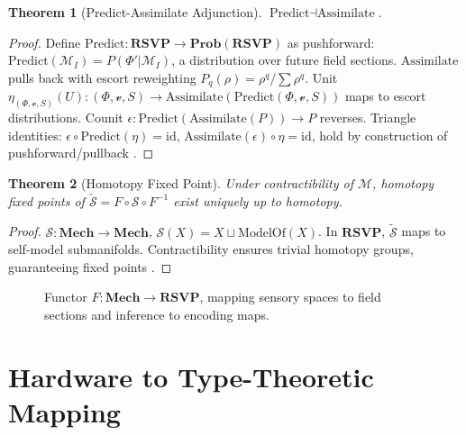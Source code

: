 \documentclass{article}
\newtheorem{theorem}{Theorem}
\begin{document}
\begin{theorem}[Predict-Assimilate Adjunction]
$\text{Predict} \dashv \text{Assimilate}$.
\end{theorem}
\begin{proof}
Define $\text{Predict}: \mathbf{RSVP} \to \mathbf{Prob}(\mathbf{RSVP})$ as pushforward: $\text{Predict}(\mathcal{M}_I) = P(\Phi' | \mathcal{M}_I)$, a distribution over future field sections. $\text{Assimilate}$ pulls back with escort reweighting $P_q(\rho) = \rho^q / \sum \rho^q$. Unit $\eta_{(\Phi,\mathcal{v},S)}(U): (\Phi, \mathcal{v}, S) \to \text{Assimilate}(\text{Predict}(\Phi, \mathcal{v}, S))$ maps to escort distributions. Counit $\epsilon: \text{Predict}(\text{Assimilate}(P)) \to P$ reverses. Triangle identities: $\epsilon \circ \text{Predict}(\eta) = \text{id}$, $\text{Assimilate}(\epsilon) \circ \eta = \text{id}$, hold by construction of pushforward/pullback \cite{Spivak2014}.
\end{proof}

\begin{theorem}[Homotopy Fixed Point]
Under contractibility of $\mathcal{M}$, homotopy fixed points of $\widetilde{\mathcal{S}} = F \circ \mathcal{S} \circ F^{-1}$ exist uniquely up to homotopy.
\end{theorem}
\begin{proof}
$\mathcal{S}: \mathbf{Mech} \to \mathbf{Mech}$, $\mathcal{S}(X) = X \sqcup \text{ModelOf}(X)$. In $\mathbf{RSVP}$, $\widetilde{\mathcal{S}}$ maps to self-model submanifolds. Contractibility ensures trivial homotopy groups, guaranteeing fixed points \cite{Awodey2010}.
\end{proof}

\begin{figure}[h]
\centering
{}
\caption{Functor $F: \mathbf{Mech} \to \mathbf{RSVP}$, mapping sensory spaces to field sections and inference to encoding maps.}
\label{fig:functor_mapping}
\end{figure}

\section{Hardware to Type-Theoretic Mapping}
\end{document}
